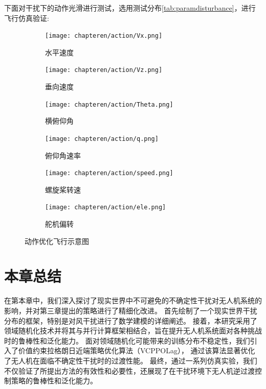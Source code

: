 下面对干扰下的动作光滑进行测试，选用测试分布\autoref{tab:paramdisturbance}，进行飞行仿真验证:
\begin{figure}[H]
    \centering
    \begin{subfigure}{.46\textwidth}
        \centering
        \texttt{[image: chapteren/action/Vx.png]}
        \caption{水平速度}
        \label{fig:sub1}
    \end{subfigure}%
    \begin{subfigure}{.46\textwidth}
        \centering
        \texttt{[image: chapteren/action/Vz.png]}
        \caption{垂向速度}
        \label{fig:sub2}
    \end{subfigure}
    \begin{subfigure}{.46\textwidth}
        \centering
        \texttt{[image: chapteren/action/Theta.png]}
        \caption{横俯仰角}
        \label{fig:sub3}
    \end{subfigure}%
    \begin{subfigure}{.46\textwidth}
        \centering
        \texttt{[image: chapteren/action/q.png]}
        \caption{俯仰角速率}
        \label{fig:sub4}
    \end{subfigure}
    \begin{subfigure}{.46\textwidth}
        \centering
        \texttt{[image: chapteren/action/speed.png]}
        \caption{螺旋桨转速}
        \label{fig:sub5}
    \end{subfigure}%
    \begin{subfigure}{.46\textwidth}
        \centering
        \texttt{[image: chapteren/action/ele.png]}
        \caption{舵机偏转}
        \label{fig:sub6}
    \end{subfigure}
    \caption{动作优化飞行示意图}
    \label{fig:action_smooth}
\end{figure}
\section{本章总结}
在第本章中，我们深入探讨了现实世界中不可避免的不确定性干扰对无人机系统的影响，并对第三章提出的策略进行了精细化改进。
首先绘制了一个现实世界干扰分布的框架，特别是对风干扰进行了数学建模的详细阐述。
接着，本研究采用了领域随机化技术并将其与并行计算框架相结合，旨在提升无人机系统面对各种挑战时的鲁棒性和泛化能力。
面对领域随机化可能带来的训练分布不稳定性，我们引入了价值约束拉格朗日近端策略优化算法（VCPPOLag），
通过该算法显著优化了无人机在面临不确定性干扰时的过渡性能。
最终，通过一系列仿真实验，我们不仅验证了所提出方法的有效性和必要性，还展现了在干扰环境下无人机逆过渡控制策略的鲁棒性和泛化能力。
